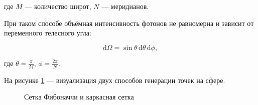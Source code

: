 \noindent где $M$ — количество широт, $N$ — меридианов.

При таком способе объёмная интенсивность фотонов не равномерна и зависит от переменного телесного угла:


\begin{equation}
	\mathrm{d}\Omega = \sin{\theta} \, \mathrm{d}\theta \, \mathrm{d}\phi,
\end{equation}

\noindent где $\displaystyle \theta = \frac{\pi}{M}$, $\displaystyle \phi = \frac{2\pi}{N}$.

На рисунке \ref{img:fibonacci-and-wire-spheres} — визуализация двух способов генерации точек на сфере.

\begin{figure}[ht]
	\captionsetup{justification=centering}
	\caption{Сетка Фибоначчи и каркасная сетка}
	\label{img:fibonacci-and-wire-spheres}
\end{figure}

